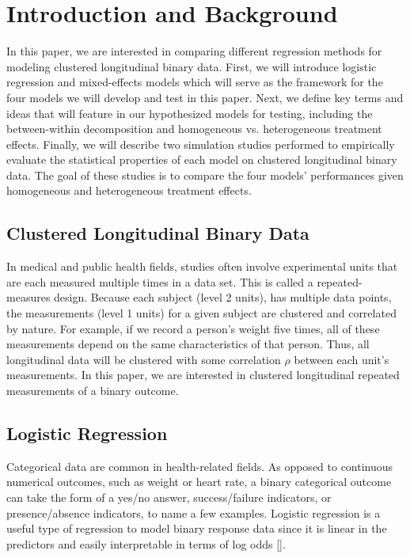 \documentclass{article}
\begin{document}
\tableofcontents
\begin{appendices}

\end{appendices}
\newpage



\section{Introduction and Background}
    In this paper, we are interested in comparing different regression methods for modeling clustered longitudinal binary data. First, we will introduce logistic regression and mixed-effects models which will serve as the framework for the four models we will develop and test in this paper. Next, we define key terms and ideas that will feature in our hypothesized models for testing, including the between-within decomposition and homogeneous vs. heterogeneous treatment effects. Finally, we will describe two simulation studies performed to empirically evaluate the statistical properties of each model on clustered longitudinal binary data. The goal of these studies is to compare the four models' performances given homogeneous and heterogeneous treatment effects. 

    \subsection{Clustered Longitudinal Binary Data}
    In medical and public health fields, studies often involve experimental units that are each measured multiple times in a data set. This is called a repeated-measures design. Because each subject (level 2 units), has multiple data points, the measurements (level 1 units) for a given subject are clustered and correlated by nature. For example, if we record a person's weight five times, all of these measurements depend on the same characteristics of that person. Thus, all longitudinal data will be clustered with some correlation $\rho$ between each unit's measurements. In this paper, we are interested in clustered longitudinal repeated measurements of a binary outcome.

    \subsection{Logistic Regression}
    Categorical data are common in health-related fields. As opposed to continuous numerical outcomes, such as weight or heart rate, a binary categorical outcome can take the form of a yes/no answer, success/failure indicators, or presence/absence indicators, to name a few examples. Logistic regression is a useful type of regression to model binary response data since it is linear in the predictors and easily interpretable in terms of log odds [\citealt{agresti2015foundations}].
    
\end{document}
